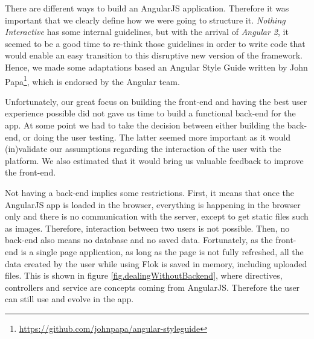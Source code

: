 \documentclass[a4paper,12pt, oneside]{article}
\begin{document}
There are different ways to build an AngularJS application.
Therefore it was important that we clearly define how we were going to structure it.
\emph{Nothing Interactive} has some internal guidelines, but with the arrival of \emph{Angular 2}, it seemed to be a good time to re-think those guidelines in order to write code that would enable an easy transition to this disruptive new version of the framework.
Hence, we made some adaptations based an Angular Style Guide written by John Papa\footnote{\url{https://github.com/johnpapa/angular-styleguide}}, which is endorsed by the Angular team.

Unfortunately, our great focus on building the front-end and having the best user experience possible did not gave us time to build a functional back-end for the app.
At some point we had to take the decision between either building the back-end, or doing the user testing.
The latter seemed more important as it would (in)validate our assumptions regarding the interaction of the user with the platform.
We also estimated that it would bring us valuable feedback to improve the front-end.

Not having a back-end implies some restrictions.
First, it means that once the AngularJS app is loaded in the browser, everything is happening in the browser only and there is no communication with the server, except to get static files such as images.
Therefore, interaction between two users is not possible.
Then, no back-end also means no database and no saved data.
Fortunately, as the front-end is a single page application, as long as the page is not fully refreshed, all the data created by the user while using Flok is saved in memory, including uploaded files.
This is shown in figure \ref{fig.dealingWithoutBackend}, where directives, controllers and service are concepts coming from AngularJS.
Therefore the user can still use and evolve in the app.
\end{document}
